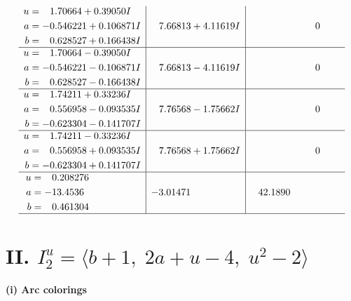 \documentclass[1p]{elsarticle_modified}
\theoremstyle{definition}
\begin{document}
$$\begin{array}{c|c|c}
\begin{aligned}
u &= \phantom{-}1.70664 + 0.39050 I \\
a &= -0.546221 + 0.106871 I \\
b &= \phantom{-}0.628527 + 0.166438 I\end{aligned}
 & \phantom{-}7.66813 + 4.11619 I & \phantom{-0.000000 } 0 \\ \hline\begin{aligned}
u &= \phantom{-}1.70664 - 0.39050 I \\
a &= -0.546221 - 0.106871 I \\
b &= \phantom{-}0.628527 - 0.166438 I\end{aligned}
 & \phantom{-}7.66813 - 4.11619 I & \phantom{-0.000000 } 0 \\ \hline\begin{aligned}
u &= \phantom{-}1.74211 + 0.33236 I \\
a &= \phantom{-}0.556958 - 0.093535 I \\
b &= -0.623304 - 0.141707 I\end{aligned}
 & \phantom{-}7.76568 - 1.75662 I & \phantom{-0.000000 } 0 \\ \hline\begin{aligned}
u &= \phantom{-}1.74211 - 0.33236 I \\
a &= \phantom{-}0.556958 + 0.093535 I \\
b &= -0.623304 + 0.141707 I\end{aligned}
 & \phantom{-}7.76568 + 1.75662 I & \phantom{-0.000000 } 0 \\ \hline\begin{aligned}
u &= \phantom{-}0.208276\phantom{ +0.000000I} \\
a &= -13.4536\phantom{ +0.000000I} \\
b &= \phantom{-}0.461304\phantom{ +0.000000I}\end{aligned}
 & -3.01471\phantom{ +0.000000I} & \phantom{-}42.1890\phantom{ +0.000000I}\\
 \hline 
 \end{array}$$\newpage\newpage\renewcommand{\arraystretch}{1}
\centering \section*{II. $I^u_{2}= \langle b+1,\;2 a+u-4,\;u^2-2 \rangle$}
\flushleft \textbf{(i) Arc colorings}\\
\end{document}
